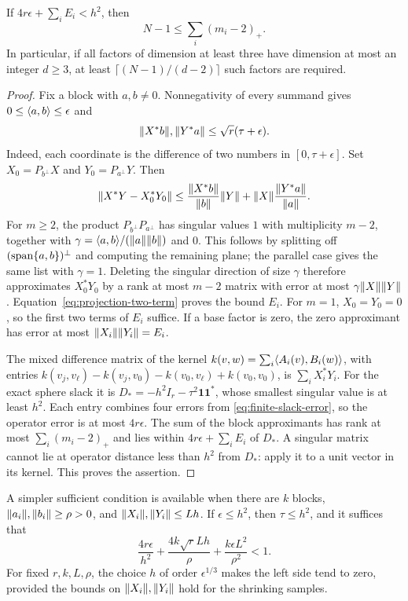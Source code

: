 \begin{theorem}\label{thm:finite-approximation}
If $4r\epsilon+\sum_iE_i<h^2$, then
\[
 N-1\leq\sum_i(m_i-2)_+.
\]
In particular, if all factors of dimension at least three have dimension
at most an integer $d\geq3$, at least
$\lceil(N-1)/(d-2)\rceil$ such factors are required.
\end{theorem}
\begin{proof}
Fix a block with $a,b\ne0$. Nonnegativity of every summand gives
$0\leq\langle a,b\rangle\leq\epsilon$ and
\[
 \lVert X^*b\rVert,\lVert Y^*a\rVert\leq\sqrt r(\tau+\epsilon).
\]
Indeed, each coordinate is the difference of two numbers in
$[0,\tau+\epsilon]$. Set $X_0=P_{b^\perp}X$ and
$Y_0=P_{a^\perp}Y$. Then
\begin{equation}\label{eq:projection-two-term}
 \lVert X^*Y-X_0^*Y_0\rVert
 \leq\frac{\lVert X^*b\rVert}{\lVert b\rVert}\lVert Y\rVert
       +\lVert X\rVert\frac{\lVert Y^*a\rVert}{\lVert a\rVert}.
\end{equation}
For $m\geq2$, the product $P_{b^\perp}P_{a^\perp}$ has singular
values $1$ with multiplicity $m-2$, together with
$\gamma=\langle a,b\rangle/(\lVert a\rVert\lVert b\rVert)$ and $0$. This follows by
splitting off $(\operatorname{span}\{a,b\})^\perp$ and computing the remaining
plane; the parallel case gives the same list with $\gamma=1$.
Deleting the singular direction of size $\gamma$ therefore approximates
$X_0^*Y_0$ by a rank at most $m-2$ matrix with error at most
$\gamma\lVert X\rVert\lVert Y\rVert$. Equation~\eqref{eq:projection-two-term}
proves the bound $E_i$. For $m=1$, $X_0=Y_0=0$, so the first two
terms of $E_i$ suffice. If a base factor is zero, the zero approximant
has error at most $\lVert X_i\rVert\lVert Y_i\rVert=E_i$.

The mixed difference matrix of the kernel
$k(v,w)=\sum_i\langle A_i(v),B_i(w)\rangle$, with entries
$k(v_j,v_\ell)-k(v_j,v_0)-k(v_0,v_\ell)+k(v_0,v_0)$, is
$\sum_iX_i^*Y_i$.
For the exact sphere slack it is
$D_*=-h^2I_r-\tau^2\mathbf1\mathbf1^*$, whose smallest singular value
is at least $h^2$. Each entry combines four errors from
\eqref{eq:finite-slack-error}, so the operator error is at most
$4r\epsilon$.
The sum of the block approximants has rank at most $\sum_i(m_i-2)_+$
and lies within $4r\epsilon+\sum_iE_i$ of $D_*$. A singular matrix
cannot lie at operator distance less than $h^2$ from $D_*$: apply it
to a unit vector in its kernel. This proves the assertion.
\end{proof}

A simpler sufficient condition is available when there are $k$ blocks,
$\lVert a_i\rVert,\lVert b_i\rVert\geq\rho>0$, and
$\lVert X_i\rVert,\lVert Y_i\rVert\leq Lh$. If $\epsilon\leq h^2$, then
$\tau\leq h^2$, and it suffices that
\begin{equation}\label{eq:finite-uniform-threshold}
 \frac{4r\epsilon}{h^2}
 +\frac{4k\sqrt rLh}{\rho}
 +\frac{k\epsilon L^2}{\rho^2}<1.
\end{equation}
For fixed $r,k,L,\rho$, the choice $h$ of order $\epsilon^{1/3}$
makes the left side tend to zero, provided the bounds on
$\lVert X_i\rVert,\lVert Y_i\rVert$ hold for the shrinking samples.

